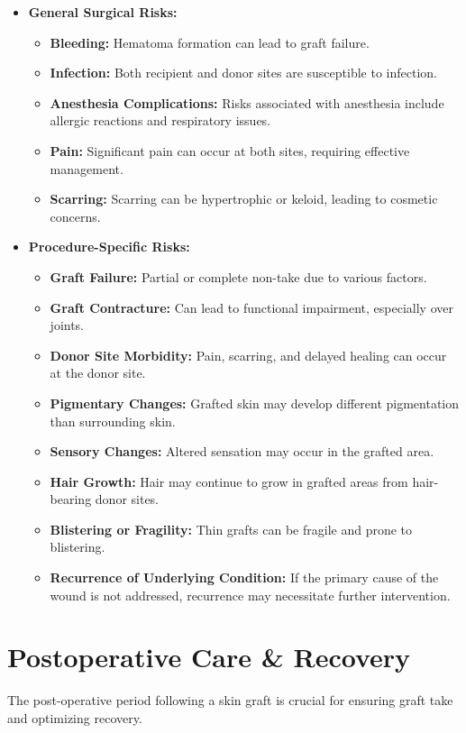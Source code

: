 \begin{itemize}
  \item \textbf{General Surgical Risks:}
    \begin{itemize}
      \item \textbf{Bleeding:} Hematoma formation can lead to graft failure.
      \item \textbf{Infection:} Both recipient and donor sites are susceptible to infection.
      \item \textbf{Anesthesia Complications:} Risks associated with anesthesia include allergic reactions and respiratory issues.
      \item \textbf{Pain:} Significant pain can occur at both sites, requiring effective management.
      \item \textbf{Scarring:} Scarring can be hypertrophic or keloid, leading to cosmetic concerns.
    \end{itemize}
  
  \item \textbf{Procedure-Specific Risks:}
    \begin{itemize}
      \item \textbf{Graft Failure:} Partial or complete non-take due to various factors.
      \item \textbf{Graft Contracture:} Can lead to functional impairment, especially over joints.
      \item \textbf{Donor Site Morbidity:} Pain, scarring, and delayed healing can occur at the donor site.
      \item \textbf{Pigmentary Changes:} Grafted skin may develop different pigmentation than surrounding skin.
      \item \textbf{Sensory Changes:} Altered sensation may occur in the grafted area.
      \item \textbf{Hair Growth:} Hair may continue to grow in grafted areas from hair-bearing donor sites.
      \item \textbf{Blistering or Fragility:} Thin grafts can be fragile and prone to blistering.
      \item \textbf{Recurrence of Underlying Condition:} If the primary cause of the wound is not addressed, recurrence may necessitate further intervention.
    \end{itemize}
\end{itemize}

\section*{Postoperative Care \& Recovery}
The post-operative period following a skin graft is crucial for ensuring graft take and optimizing recovery. 

